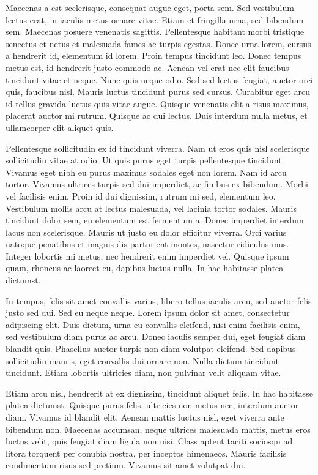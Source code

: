 Maecenas a est scelerisque, consequat augue eget, porta sem. Sed vestibulum lectus erat, in iaculis metus ornare vitae. Etiam et fringilla urna, sed bibendum sem. Maecenas posuere venenatis sagittis. Pellentesque habitant morbi tristique senectus et netus et malesuada fames ac turpis egestas. Donec urna lorem, cursus a hendrerit id, elementum id lorem. Proin tempus tincidunt leo. Donec tempus metus est, id hendrerit justo commodo ac. Aenean vel erat nec elit faucibus tincidunt vitae et neque. Nunc quis neque odio. Sed sed lectus feugiat, auctor orci quis, faucibus nisl. Mauris luctus tincidunt purus sed cursus. Curabitur eget arcu id tellus gravida luctus quis vitae augue. Quisque venenatis elit a risus maximus, placerat auctor mi rutrum. Quisque ac dui lectus. Duis interdum nulla metus, et ullamcorper elit aliquet quis.

Pellentesque sollicitudin ex id tincidunt viverra. Nam ut eros quis nisl scelerisque sollicitudin vitae at odio. Ut quis purus eget turpis pellentesque tincidunt. Vivamus eget nibh eu purus maximus sodales eget non lorem. Nam id arcu tortor. Vivamus ultrices turpis sed dui imperdiet, ac finibus ex bibendum. Morbi vel facilisis enim. Proin id dui dignissim, rutrum mi sed, elementum leo. Vestibulum mollis arcu at lectus malesuada, vel lacinia tortor sodales. Mauris tincidunt dolor sem, eu elementum est fermentum a. Donec imperdiet interdum lacus non scelerisque. Mauris ut justo eu dolor efficitur viverra. Orci varius natoque penatibus et magnis dis parturient montes, nascetur ridiculus mus. Integer lobortis mi metus, nec hendrerit enim imperdiet vel. Quisque ipsum quam, rhoncus ac laoreet eu, dapibus luctus nulla. In hac habitasse platea dictumst.

In tempus, felis sit amet convallis varius, libero tellus iaculis arcu, sed auctor felis justo sed dui. Sed eu neque neque. Lorem ipsum dolor sit amet, consectetur adipiscing elit. Duis dictum, urna eu convallis eleifend, nisi enim facilisis enim, sed vestibulum diam purus ac arcu. Donec iaculis semper dui, eget feugiat diam blandit quis. Phasellus auctor turpis non diam volutpat eleifend. Sed dapibus sollicitudin mauris, eget convallis dui ornare non. Nulla dictum tincidunt tincidunt. Etiam lobortis ultricies diam, non pulvinar velit aliquam vitae.

Etiam arcu nisl, hendrerit at ex dignissim, tincidunt aliquet felis. In hac habitasse platea dictumst. Quisque purus felis, ultricies non metus nec, interdum auctor diam. Vivamus id blandit elit. Aenean mattis luctus nisl, eget viverra ante bibendum non. Maecenas accumsan, neque ultrices malesuada mattis, metus eros luctus velit, quis feugiat diam ligula non nisi. Class aptent taciti sociosqu ad litora torquent per conubia nostra, per inceptos himenaeos. Mauris facilisis condimentum risus sed pretium. Vivamus sit amet volutpat dui.

